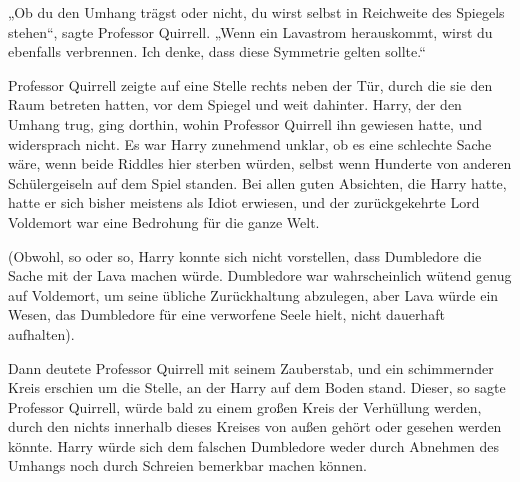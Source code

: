 „Ob du den Umhang trägst oder nicht, du wirst selbst in Reichweite des Spiegels stehen“, sagte Professor Quirrell. „Wenn ein Lavastrom herauskommt, wirst du ebenfalls verbrennen. Ich denke, dass diese Symmetrie gelten sollte.“

Professor Quirrell zeigte auf eine Stelle rechts neben der Tür, durch die sie den Raum betreten hatten, vor dem Spiegel und weit dahinter.
Harry, der den Umhang trug, ging dorthin, wohin Professor Quirrell ihn gewiesen hatte, und widersprach nicht. Es war Harry zunehmend unklar, ob es eine schlechte Sache wäre, wenn beide Riddles hier sterben würden, selbst wenn Hunderte von anderen Schülergeiseln auf dem Spiel standen. Bei allen guten Absichten, die Harry hatte, hatte er sich bisher meistens als Idiot erwiesen, und der zurückgekehrte Lord Voldemort war eine Bedrohung für die ganze Welt.

(Obwohl, so oder so, Harry konnte sich nicht vorstellen, dass Dumbledore die Sache mit der Lava machen würde. Dumbledore war wahrscheinlich wütend genug auf Voldemort, um seine übliche Zurückhaltung abzulegen, aber Lava würde ein Wesen, das Dumbledore für eine verworfene Seele hielt, nicht dauerhaft aufhalten).

Dann deutete Professor Quirrell mit seinem Zauberstab, und ein schimmernder Kreis erschien um die Stelle, an der Harry auf dem Boden stand. Dieser, so sagte Professor Quirrell, würde bald zu einem großen Kreis der Verhüllung werden, durch den nichts innerhalb dieses Kreises von außen gehört oder gesehen werden könnte. Harry würde sich dem falschen Dumbledore weder durch Abnehmen des Umhangs noch durch Schreien bemerkbar machen können.

